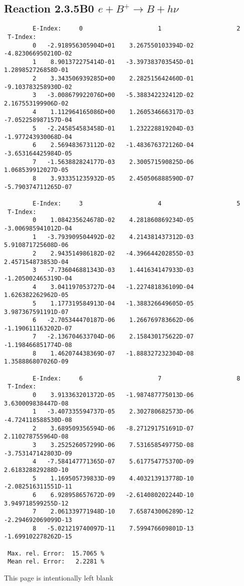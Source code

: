 \documentclass[12pt]{article}
\begin{document}
\subsection{
Reaction 2.3.5B0 $ e + B^+ \rightarrow B + h\nu $
}


\begin{small}\begin{verbatim}
        E-Index:     0                     1                     2
 T-Index:
        0   -2.918956305904D+01    3.267550103394D-02   -4.823066950210D-02
        1    8.901372275414D-01   -3.397383703545D-01    1.289852726858D-01
        2    3.343506939285D+00    2.282515642460D-01   -9.103783258930D-02
        3   -3.008679922076D+00   -5.388342232412D-02    2.167553199906D-02
        4    1.112964165086D+00    1.260534666317D-03   -7.052258987157D-04
        5   -2.245854583458D-01    1.232228819204D-03   -1.977243930068D-04
        6    2.569483673112D-02   -1.483676372126D-04   -3.653164425984D-05
        7   -1.563882824177D-03    2.300571590825D-06    1.068539912027D-05
        8    3.933351235932D-05    2.450506888590D-07   -5.790374711265D-07

        E-Index:     3                     4                     5
 T-Index:
        0    1.084235624678D-02    4.281860869234D-05   -3.006985941012D-04
        1   -3.793909504492D-02    4.214381437312D-03    5.910871725608D-06
        2    2.943514986182D-02   -4.396644202855D-03    2.457154873853D-04
        3   -7.736046881343D-03    1.441634147933D-03   -1.205002465319D-04
        4    3.041197053727D-04   -1.227481836109D-04    1.626382262962D-05
        5    1.177319584913D-04   -1.388326649605D-05    3.987367591191D-07
        6   -2.705344470187D-06    1.266769783662D-06   -1.190611163202D-07
        7   -2.136704633704D-06    2.158430175622D-07   -1.198466851774D-08
        8    1.462074438369D-07   -1.888327232304D-08    1.358886807026D-09

        E-Index:     6                     7                     8
 T-Index:
        0    3.913363201372D-05   -1.987487775013D-06    3.630009838447D-08
        1   -3.407335594737D-05    2.302780682573D-06   -4.724118588530D-08
        2    3.689509356594D-06   -8.271291751691D-07    2.110278755964D-08
        3    3.252526057299D-06    7.531658549775D-08   -3.753147142803D-09
        4   -7.584147771365D-07    5.617754775370D-09    2.618328829288D-10
        5    1.169505739833D-09    4.403213913778D-10   -2.082516311551D-11
        6    6.928958657672D-09   -2.614080202244D-10    3.949718599255D-12
        7    2.061339771948D-10    7.658743006289D-12   -2.294692069099D-13
        8   -5.021219740097D-11    7.599476609801D-13   -1.699102278262D-15

 Max. rel. Error:  15.7065 %
 Mean rel. Error:   2.2281 %

\end{verbatim}\end{small}
\newpage
This page is intentionally left blank
\newpage
\end{document}
